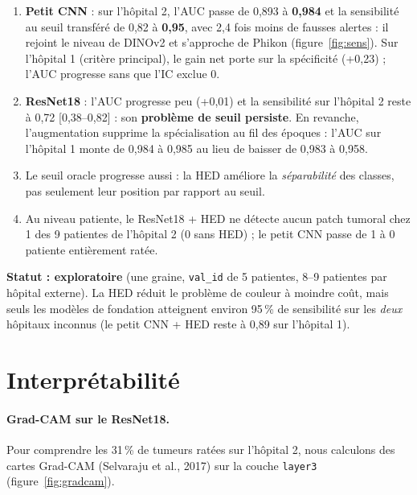 \documentclass[11pt,a4paper]{article}
\begin{document}
\begin{constat}
\begin{enumerate}
  \item \textbf{Petit CNN} : sur l'hôpital 2, l'AUC passe de 0,893 à \textbf{0,984} et la sensibilité au seuil transféré de 0,82 à
        \textbf{0,95}, avec 2,4 fois moins de fausses alertes : il rejoint le niveau de DINOv2 et s'approche de Phikon
        (figure~\ref{fig:sens}). Sur l'hôpital 1 (critère principal), le gain net porte sur la spécificité (+0,23) ; l'AUC
        progresse sans que l'IC exclue 0.
  \item \textbf{ResNet18} : l'AUC progresse peu (+0,01) et la sensibilité sur l'hôpital 2 reste à 0,72 [0,38–0,82] : son
        \textbf{problème de seuil persiste}. En revanche, l'augmentation supprime la spécialisation au fil des époques : l'AUC sur
        l'hôpital 1 monte de 0,984 à 0,985 au lieu de baisser de 0,983 à 0,958.
  \item Le seuil oracle progresse aussi : la HED améliore la \emph{séparabilité} des classes, pas seulement leur position par rapport au seuil.
  \item Au niveau patiente, le ResNet18 + HED ne détecte aucun patch tumoral chez 1 des 9 patientes de l'hôpital 2 (0 sans HED) ;
        le petit CNN passe de 1 à 0 patiente entièrement ratée.
\end{enumerate}
\textbf{Statut : exploratoire} (une graine, \texttt{val\_id} de 5 patientes, 8–9 patientes par hôpital externe). La HED réduit
le problème de couleur à moindre coût, mais seuls les modèles de fondation atteignent environ 95\,\% de sensibilité sur les
\emph{deux} hôpitaux inconnus (le petit CNN + HED reste à 0,89 sur l'hôpital 1).
\end{constat}


\section{Interprétabilité}

\paragraph{Grad-CAM sur le ResNet18.} Pour comprendre les 31\,\% de tumeurs ratées sur l'hôpital 2, nous calculons des cartes
Grad-CAM (Selvaraju et al., 2017) sur la couche \texttt{layer3} (figure~\ref{fig:gradcam}).
\end{document}
